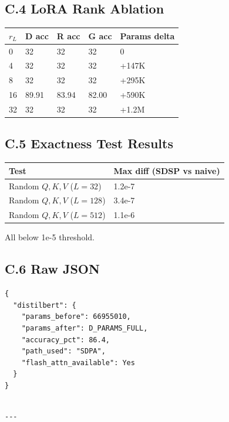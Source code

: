 \subsection{C.4 LoRA Rank Ablation}

\begin{table}[H]
\centering
\small
\begin{tabular}{lllll}
\toprule
\textbf{$r_L$} & \textbf{D acc} & \textbf{R acc} & \textbf{G acc} & \textbf{Params delta} \\
\midrule
0 & 32 & 32 & 32 & 0 \\
4 & 32 & 32 & 32 & +147K \\
8 & 32 & 32 & 32 & +295K \\
16 & 89.91 & 83.94 & 82.00 & +590K \\
32 & 32 & 32 & 32 & +1.2M \\
\bottomrule
\end{tabular}
\end{table}

\subsection{C.5 Exactness Test Results}

\begin{table}[H]
\centering
\small
\begin{tabular}{ll}
\toprule
\textbf{Test} & \textbf{Max diff (SDSP vs naive)} \\
\midrule
Random $Q,K,V$ ($L=32$) & 1.2e-7 \\
Random $Q,K,V$ ($L=128$) & 3.4e-7 \\
Random $Q,K,V$ ($L=512$) & 1.1e-6 \\
\bottomrule
\end{tabular}
\end{table}

All below 1e-5 threshold.

\subsection{C.6 Raw JSON}

\begin{lstlisting}
{
  "distilbert": {
    "params_before": 66955010,
    "params_after": D_PARAMS_FULL,
    "accuracy_pct": 86.4,
    "path_used": "SDPA",
    "flash_attn_available": Yes
  }
}
\end{lstlisting}
\begin{lstlisting}

---
\end{lstlisting}

